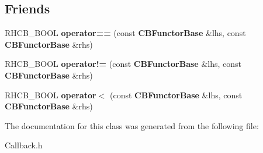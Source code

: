 \subsection*{Friends}
\begin{DoxyCompactItemize}
\item 
R\+H\+C\+B\+\_\+\+B\+O\+OL {\bfseries operator==} (const {\bf C\+B\+Functor\+Base} \&lhs, const {\bf C\+B\+Functor\+Base} \&rhs)\label{classCBFunctorBase_a227c0f351c0050b1d8c8fb5eb21fda4a}

\item 
R\+H\+C\+B\+\_\+\+B\+O\+OL {\bfseries operator!=} (const {\bf C\+B\+Functor\+Base} \&lhs, const {\bf C\+B\+Functor\+Base} \&rhs)\label{classCBFunctorBase_a71e018e8e95ad4ac2722f07bcf006fbc}

\item 
R\+H\+C\+B\+\_\+\+B\+O\+OL {\bfseries operator$<$} (const {\bf C\+B\+Functor\+Base} \&lhs, const {\bf C\+B\+Functor\+Base} \&rhs)\label{classCBFunctorBase_a34ea68bc41f2e609f96a31cc6c224c70}

\end{DoxyCompactItemize}


The documentation for this class was generated from the following file\+:\begin{DoxyCompactItemize}
\item 
Callback.\+h\end{DoxyCompactItemize}
